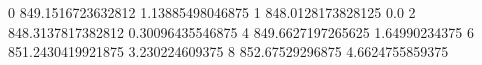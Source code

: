 0 849.1516723632812 1.13885498046875
1 848.0128173828125 0.0
2 848.3137817382812 0.30096435546875
4 849.6627197265625 1.64990234375
6 851.2430419921875 3.230224609375
8 852.67529296875 4.6624755859375
